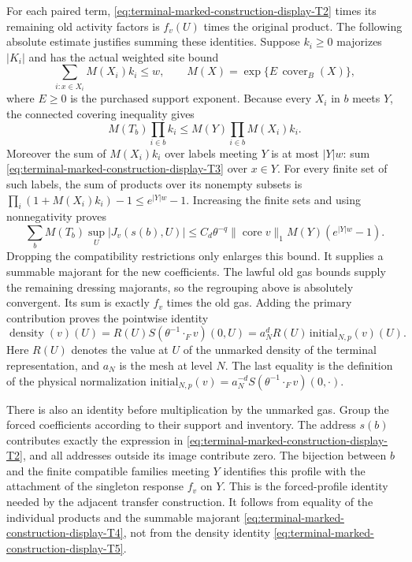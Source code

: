 For each paired term, \eqref{eq:terminal-marked-construction-display-T2} times its remaining old activity factors is
$f_v(U)$ times the original product. The following absolute estimate
justifies summing these identities. Suppose $k_i\ge0$ majorizes
$|K_i|$ and has the actual weighted site bound
\begin{equation}
 \sum_{i:x\in X_i} M(X_i)k_i\le w,
 \qquad M(X)=\exp\{E\,\operatorname{cover}_B(X)\},
 \label{eq:terminal-marked-construction-display-T3}
\end{equation}
where $E\ge0$ is the purchased support exponent. Because every $X_i$ in
$b$ meets $Y$, the connected covering inequality gives
\[
 M(T_b)\prod_{i\in b}k_i\le M(Y)\prod_{i\in b}M(X_i)k_i.
\]
Moreover the sum of $M(X_i)k_i$ over labels meeting $Y$ is at most
$|Y|w$: sum \eqref{eq:terminal-marked-construction-display-T3} over $x\in Y$. For every finite set of such labels,
the sum of products over its nonempty subsets is
$\prod_i(1+M(X_i)k_i)-1\le e^{|Y|w}-1$.
Increasing the finite sets and using nonnegativity proves
\begin{equation}
 \sum_b M(T_b)\sup_U|J_v(s(b),U)|
 \le C_d\theta^{-q}\|\operatorname{core}v\|_1
             M(Y)(e^{|Y|w}-1).
 \label{eq:terminal-marked-construction-display-T4}
\end{equation}
Dropping the compatibility restrictions only enlarges this bound.
It supplies a summable majorant for the new coefficients. The lawful
old gas bounds supply the remaining dressing majorants, so the
regrouping above is absolutely convergent. Its sum is exactly $f_v$
times the old gas. Adding the primary contribution proves the pointwise
identity
\begin{equation}
 \operatorname{density}(v)(U)
   =R(U)S(\theta^{-1}\mathbin{\cdot_F}v)(0,U)
   =a_N^d R(U)\,\mathrm{initial}_{N,p}(v)(U).
 \label{eq:terminal-marked-construction-display-T5}
\end{equation}
Here $R(U)$ denotes the value at $U$ of the unmarked density of the
terminal representation, and $a_N$ is the mesh at level $N$. The last
equality is the definition of the physical normalization
$\mathrm{initial}_{N,p}(v)=a_N^{-d}S(\theta^{-1}\mathbin{\cdot_F}v)(0,\cdot)$.

There is also an identity before multiplication by the unmarked gas.
Group the forced coefficients according to their support and inventory.
The address $s(b)$ contributes exactly the expression in \eqref{eq:terminal-marked-construction-display-T2}, and
all addresses outside its image contribute zero. The bijection between
$b$ and the finite compatible families meeting $Y$ identifies this
profile with the attachment of the singleton response $f_v$ on $Y$.
This is the forced-profile identity needed by the adjacent transfer
construction. It follows from equality of the individual products and
the summable majorant \eqref{eq:terminal-marked-construction-display-T4}, not from the density identity \eqref{eq:terminal-marked-construction-display-T5}.

